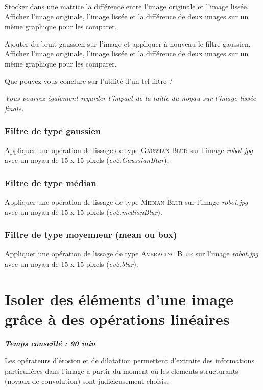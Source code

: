 \documentclass[a4paper,11pt,titlepage]{article} %
\begin{document}
\Manip Stocker dans une matrice la différence entre l'image originale et l'image lissée. Afficher l'image originale, l'image lissée et la différence de deux images sur un même graphique pour les comparer.

\Manip Ajouter du bruit gaussien sur l'image et appliquer à nouveau le filtre gaussien. Afficher l'image originale, l'image lissée et la différence de deux images sur un même graphique pour les comparer.

\Quest Que pouvez-vous conclure sur l'utilité d'un tel filtre ?

\textit{Vous pourrez également regarder l'impact de la taille du noyau sur l'image lissée finale.}


\subsubsection{Filtre de type gaussien}

\Manip Appliquer une opération de lissage de type \textsc{Gaussian Blur} sur l'image \textsl{robot.jpg} avec un noyau de 15 x 15 pixels (\textsl{cv2.GaussianBlur}).

\subsubsection{Filtre de type médian}

\Manip Appliquer une opération de lissage de type \textsc{Median Blur} sur l'image \textsl{robot.jpg} avec un noyau de 15 x 15 pixels (\textsl{cv2.medianBlur}).

\subsubsection{Filtre de type moyenneur (mean ou box)}

\Manip Appliquer une opération de lissage de type \textsc{Averaging Blur} sur l'image \textsl{robot.jpg} avec un noyau de 15 x 15 pixels (\textsl{cv2.blur}).


\newpage	
\section{Isoler des éléments d'une image grâce à des opérations linéaires}

\begin{center} \textbf{\textit{Temps conseillé : 90 min}} \end{center}

Les opérateurs d'érosion et de dilatation permettent d'extraire des informations particulières dans l'image à partir du moment où les éléments structurants (noyaux de convolution) sont judicieusement choisis.
\end{document}

